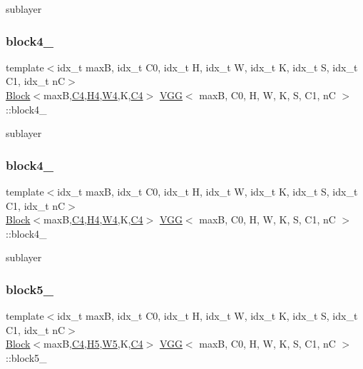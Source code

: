 sublayer \mbox{\label{structVGG_a449afed7008be198d32d2dfb3b9c32ff}} 
\subsubsection{\texorpdfstring{block4\+\_}{block4\_2}}
{\footnotesize\ttfamily template$<$idx\+\_\+t maxB, idx\+\_\+t C0, idx\+\_\+t H, idx\+\_\+t W, idx\+\_\+t K, idx\+\_\+t S, idx\+\_\+t C1, idx\+\_\+t nC$>$ \\
\hyperlink{structBlock}{Block}$<$maxB,\hyperlink{structVGG_a4d54a1cc3e99340dfb67e7252719c663}{C4},\hyperlink{structVGG_a1754afced5b0bbb91031179c1f58ee29}{H4},\hyperlink{structVGG_a9728cd3ccfa5011d2a795dff7e9abfe8}{W4},K,\hyperlink{structVGG_a4d54a1cc3e99340dfb67e7252719c663}{C4}$>$ \hyperlink{structVGG}{V\+GG}$<$ maxB, C0, H, W, K, S, C1, nC $>$\+::block4\+\_}

sublayer \mbox{\label{structVGG_a67b4a234cca6e0ececd290de5ef13063}} 
\subsubsection{\texorpdfstring{block4\+\_}{block4\_3}}
{\footnotesize\ttfamily template$<$idx\+\_\+t maxB, idx\+\_\+t C0, idx\+\_\+t H, idx\+\_\+t W, idx\+\_\+t K, idx\+\_\+t S, idx\+\_\+t C1, idx\+\_\+t nC$>$ \\
\hyperlink{structBlock}{Block}$<$maxB,\hyperlink{structVGG_a4d54a1cc3e99340dfb67e7252719c663}{C4},\hyperlink{structVGG_a1754afced5b0bbb91031179c1f58ee29}{H4},\hyperlink{structVGG_a9728cd3ccfa5011d2a795dff7e9abfe8}{W4},K,\hyperlink{structVGG_a4d54a1cc3e99340dfb67e7252719c663}{C4}$>$ \hyperlink{structVGG}{V\+GG}$<$ maxB, C0, H, W, K, S, C1, nC $>$\+::block4\+\_}

sublayer \mbox{\label{structVGG_ae2947bb7379eb4e5803854f25883304d}} 
\subsubsection{\texorpdfstring{block5\+\_}{block5\_1}}
{\footnotesize\ttfamily template$<$idx\+\_\+t maxB, idx\+\_\+t C0, idx\+\_\+t H, idx\+\_\+t W, idx\+\_\+t K, idx\+\_\+t S, idx\+\_\+t C1, idx\+\_\+t nC$>$ \\
\hyperlink{structBlock}{Block}$<$maxB,\hyperlink{structVGG_a4d54a1cc3e99340dfb67e7252719c663}{C4},\hyperlink{structVGG_a763d01cce59fd355cbcfb7b09c3c8cdc}{H5},\hyperlink{structVGG_a01d04c8b89719716a0c45c3631765875}{W5},K,\hyperlink{structVGG_a4d54a1cc3e99340dfb67e7252719c663}{C4}$>$ \hyperlink{structVGG}{V\+GG}$<$ maxB, C0, H, W, K, S, C1, nC $>$\+::block5\+\_}

